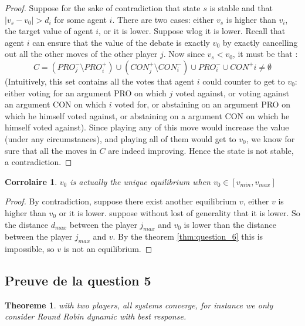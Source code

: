 \documentclass[12pt]{article}
\newtheorem{theoreme}{Theoreme}[section]
\newtheorem{corollary}{Corrolaire}[section]
\theoremstyle{defi}
\theoremstyle{not}
\theoremstyle{prob}
\begin{document}
    \begin{proof}
    Suppose for the sake of contradiction that state $s$ is stable and that $|v_s - v_0| > d_i$ for some agent $i$. There are two cases: either $v_s$ is higher than $v_i$, the target value of agent $i$, or it is lower. Suppose wlog it is lower.
    Recall that agent $i$ can ensure that the value of the debate is exactly $v_0$ by exactly cancelling out all the other moves of the other player $j$.
    Now since $v_s<v_0$, it must be that :
    $$
    C = (PRO^-_j \setminus PRO^+_i) \cup (CON^+_j \setminus CON^-_i) \cup PRO^-_i \cup CON^+i \not = \emptyset
    $$
    (Intuitively, this set contains all the votes that agent $i$ could counter to get to $v_0$: either voting for an argument PRO on which $j$ voted against, or voting against an argument CON on which $i$ voted for, or abstaining on an argument PRO on which he himself voted against, or abstaining on a argument CON on which he himself voted against).
    Since playing any of this move would increase the value (under any circumstances), and playing all of them would get to $v_0$, we know for sure that all the moves in $C$ are indeed improving. Hence the state is not stable, a contradiction.
    \end{proof}

    \begin{corollary}
      $v_0$ is actually the \emph{unique} equilibrium when $v_0 \in [v_{min},v_{max}]$
    \end{corollary}

    \begin{proof}
      By contradiction, suppose there exist another equilibrium $v$, either $v$ is higher than $v_0$ or it is lower. suppose without lost of generality that it is lower. So the distance $d_{max}$ between the player $j_{max}$ and $v_0$ is lower than the distance between the player $j_{max}$ and $v$. By the theorem \ref{thm:question_6} this is impossible, so $v$ is not an equilibrium.
    \end{proof}

    \subsection{Preuve de la question 5}

      \begin{theoreme}
        \label{thm:question_5}
        with two players, all systems converge, for instance we only consider Round Robin dynamic with best response.
      \end{theoreme}
\end{document}
